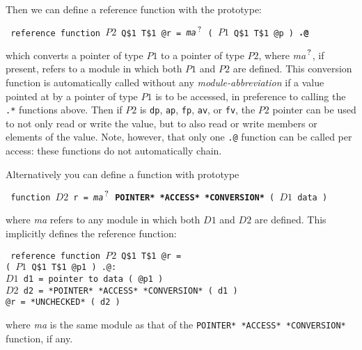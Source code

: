 \documentclass[12pt]{article}
\newcommand{\QMARK}{{$^{\,\mbox{\footnotesize ?}}$}}
\newcommand{\ttkey}[1]{{\tt \bfseries #1}}
\newenvironment{indpar}[1][0.3in]%
	{\begin{list}{}%
		     {\setlength{\itemsep}{0in}%
		      \setlength{\topsep}{0in}%
		      \setlength{\parsep}{1ex}%
		      \setlength{\labelwidth}{#1}%
		      \setlength{\leftmargin}{#1}%
		      \addtolength{\leftmargin}{\labelsep}}%
	 \item}%
	{\end{list}}
\begin{document}
Then we can define a reference function with the prototype:
\begin{indpar} \tt
reference function $P2$ Q\$1 T\$1 @r =
    {\em ma}\QMARK{} ( $P1$ Q\$1 T\$1 @p ) \ttkey{.@}
\end{indpar}
which converts a pointer of type $P1$ to a pointer of type $P2$,
where {\em ma}\QMARK{}, if present, refers to a module in which
both $P1$ and $P2$ are defined.
This conversion function is automatically called without any
{\em module-abbreviation} if a value pointed at by a pointer of type $P1$ is to
be accessed, in preference to calling the {\tt .*} functions above.
Then if $P2$ is {\tt dp}, {\tt ap}, {\tt fp}, {\tt av},
or {\tt fv}, the $P2$ pointer can be used to not only read or write
the value, but to also read or write members or elements of the
value.  Note, however, that only one {\tt .@}
function can be called per access: these functions do not
automatically chain.

Alternatively you can define a function with prototype
\begin{indpar} \tt
function $D2$ r = {\em ma}\QMARK{} \ttkey{*POINTER* *ACCESS* *CONVERSION*} ( $D1$ data )
\end{indpar}
where {\em ma} refers to any module in which both $D1$ and $D2$ are defined.
This implicitly defines the reference function:
\begin{indpar} \tt
reference function $P2$ Q\$1 T\$1 @r = \\
\hspace*{1in}{\em ma}\QMARK{} ( $P1$ Q\$1 T\$1 @p1 ) .@: \\
\hspace*{0.3in}$D1$ d1 = pointer to data ( @p1 ) \\
\hspace*{0.3in}$D2$ d2 = *POINTER* *ACCESS* *CONVERSION* ( d1 ) \\
\hspace*{0.3in}@r = *UNCHECKED* ( d2 )
\end{indpar}
where {\em ma} is the same module as that of the
{\tt *POINTER* *ACCESS* *CONVERSION*} function, if any.
\end{document}
